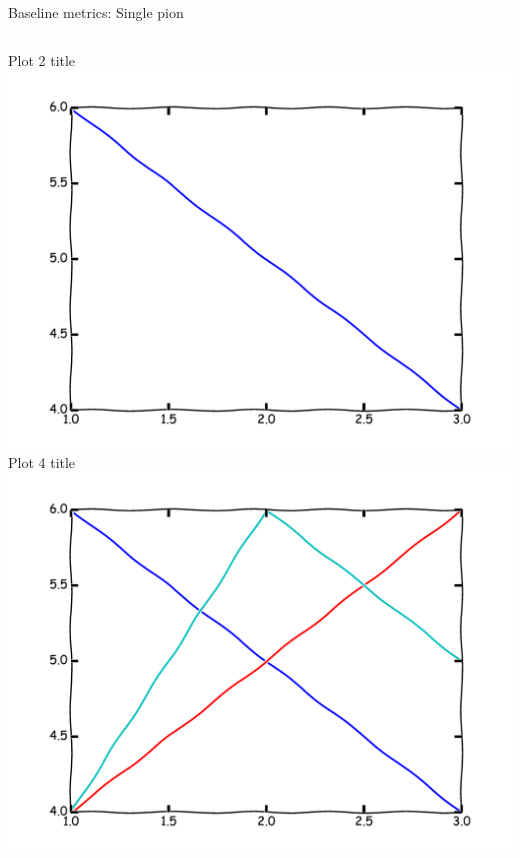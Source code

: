 \begin{frame}{Baseline metrics: Single pion}
\begin{columns}
\begin{column}{0.4\textwidth}
\begin{center}
Plot 2 title
\\
\includegraphics[width=\textwidth]{example/plot2.pdf}
\\
Plot 4 title
\\
\includegraphics[width=\textwidth]{example/plot4.pdf}
\\
\end{center}
\end{column}
\end{columns}

\end{frame}

